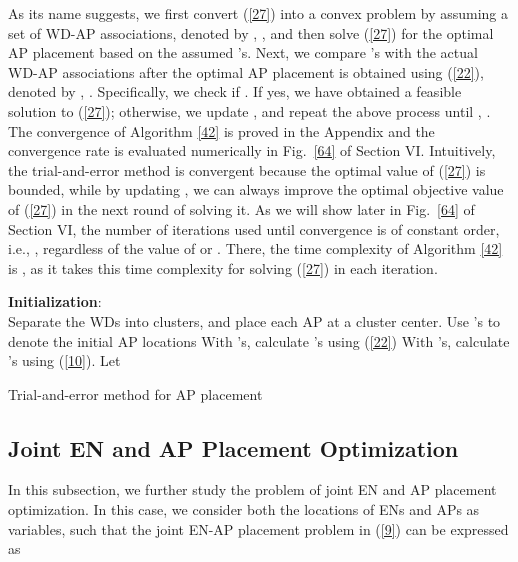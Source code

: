 \documentclass[journal, draftcls, one column, 12pt]{IEEEtran}
\begin{document}
As its name suggests, we first convert (\ref{27}) into a convex problem by assuming a set of WD-AP associations, denoted by , , and then solve (\ref{27}) for the optimal AP placement based on the assumed 's. Next, we compare 's with the actual WD-AP associations after the optimal AP placement is obtained using (\ref{22}), denoted by  , . Specifically, we check if . If yes, we have obtained a feasible solution to (\ref{27}); otherwise, we update ,  and repeat the above process until , . The convergence of Algorithm \ref{42} is proved in the Appendix and the convergence rate is evaluated numerically in Fig.~\ref{64} of Section VI. Intuitively, the trial-and-error method is convergent because the optimal value of (\ref{27}) is bounded, while by updating , we can always improve the optimal objective value of (\ref{27}) in the next round of solving it. As we will show later in Fig.~\ref{64} of Section VI, the number of iterations used until convergence is of constant order, i.e., , regardless of the value of  or . There, the time complexity of Algorithm \ref{42} is , as it takes this time complexity for solving (\ref{27}) in each iteration.


\begin{algorithm}
\footnotesize
 \SetAlgoLined

 \textbf{Initialization}:
 \\ Separate the WDs into  clusters, and place each AP at a cluster center. Use 's to denote the initial AP locations\;
 With 's, calculate 's using (\ref{22})\;
 With 's, calculate 's using (\ref{10}). Let \;

\caption{Trial-and-error method for  AP placement}
\label{42}
\end{algorithm}

\subsection{Joint EN and AP Placement Optimization}
In this subsection, we further study the problem of joint EN and AP placement optimization. In this case, we consider both the locations of ENs and APs as variables, such that the joint EN-AP placement problem in (\ref{9}) can be expressed as
\end{document}
